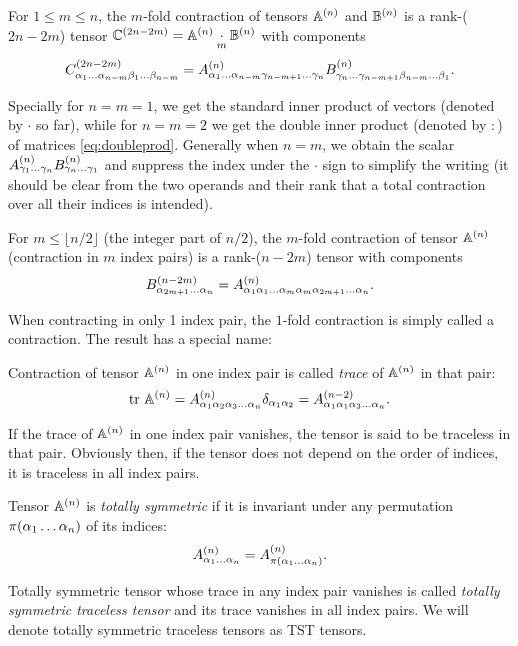 \begin{definition}\label{def:contraction}
  For $1\leq m \leq n$, the $m$-fold contraction of tensors $\AA$ and $\BB$ is a rank-($2n-2m$) tensor 
  $\CC[2n-2m] = \AA\underset{m}{\cdot}\BB$ with components
  $$
    \CCC[2n-2m]{\alpha_{1}\ldots\alpha_{n-m}\beta_1\ldots\beta_{n-m}} = 
    \AAA{\alpha_1\ldots\alpha_{n-m}\gamma_{n-m+1}\ldots\gamma_n}\BBB{\gamma_n\ldots\gamma_{n-m+1}\beta_{n-m}\ldots\beta_1}.
  $$
\end{definition}
Specially for $n = m = 1$, we get the standard inner product of vectors (denoted by $\cdot$ so far), while for
$n = m = 2$ we get the double inner product (denoted by $:$) of matrices \eqref{eq:doubleprod}. Generally when $n = m$,
we obtain the scalar $\AAA{\gamma_1\ldots\gamma_n}\BBB{\gamma_n\ldots\gamma_1}$ and suppress the index under the $\cdot$
sign to simplify the writing (it should be clear from the two operands and their rank that a total contraction over all 
their indices is intended).

\begin{definition}
  For $m \leq \lfloor n/2 \rfloor$ (the integer part of $n/2$), the $m$-fold contraction of tensor $\AA$ (contraction 
  in $m$ index pairs) is a rank-($n-2m$) tensor with components
  $$
    \BBB[n-2m]{\alpha_{2m+1}\ldots\alpha_n} = \AAA{\alpha_1\alpha_1\ldots\alpha_m\alpha_m\alpha_{2m+1}\ldots\alpha_n}.
  $$
\end{definition}
When contracting in only 1 index pair, the $1$-fold contraction is simply called a contraction. The result has a special 
name:
\begin{definition}\label{def:trace}
  Contraction of tensor $\AA$ in one index pair is called \textit{trace} of $\AA$ in that pair:
  $$
    \trace \AA = \AAA[n]{\alpha_1\alpha_2\alpha_3\ldots\alpha_n}\kron{\alpha_1}{\alpha_2} =
    \AAA[n-2]{\alpha_1\alpha_1\alpha_3\ldots\alpha_n}.
  $$ 
\end{definition}
If the trace of $\AA$ in one index pair vanishes, the tensor is said to be traceless in that pair. Obviously then, if 
the tensor does not depend on the order of indices, it is traceless in all index pairs.
\begin{definition}
  Tensor $\AA$ is \textit{totally symmetric} if it is invariant under any permutation $\perm{\alpha_1\ldots\alpha_n}$ 
  of its indices:
  $$
    \AAA{\alpha_1\ldots\alpha_n} = \AAA{\perm{\alpha_1\ldots\alpha_n}}.
  $$
\end{definition}

\begin{definition}
  Totally symmetric tensor whose trace in any index pair vanishes is called \textit{totally symmetric traceless tensor} 
  and its trace vanishes in all index pairs. We will denote totally symmetric traceless tensors as TST tensors.
\end{definition}

